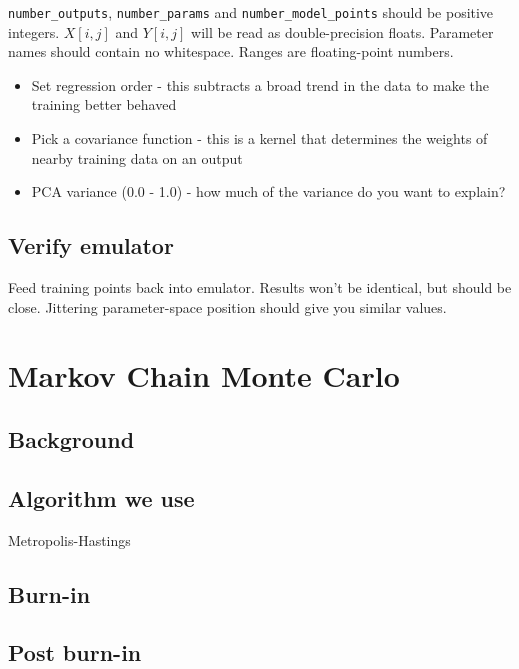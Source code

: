 \documentclass{article}
\begin{document}
\texttt{number\_outputs}, \texttt{number\_params} and
\texttt{number\_model\_points} should be positive integers.  $X[i,j]$
and $Y[i,j]$ will be read as double-precision floats.  Parameter names
should contain no whitespace.  Ranges are floating-point numbers.


\begin{itemize}

\item Set regression order - this subtracts a broad trend in the data to make the training better behaved

\item Pick a covariance function - this is a kernel that determines the weights of nearby training data on an output

\item PCA variance (0.0 - 1.0) - how much of the variance do you want to explain?

\end{itemize}

\subsection{Verify emulator}

Feed training points back into emulator. Results won't be identical, but should be close. Jittering parameter-space position should give you similar values.

\section{Markov Chain Monte Carlo}

\subsection{Background}

\subsection{Algorithm we use}

Metropolis-Hastings

\subsection{Burn-in}

\subsection{Post burn-in}
\end{document}

